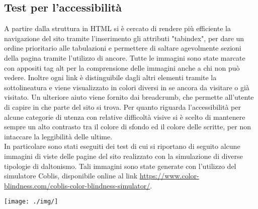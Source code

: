 	\subsection{Test per l'accessibilità}
	A partire dalla struttura in HTML si è cercato di rendere più efficiente la navigazione del sito tramite l'inserimento gli attributi "tabindex", per dare un ordine prioritario alle tabulazioni e permettere di saltare agevolmente sezioni della pagina tramite l'utilizzo di ancore. Tutte le immagini sono state marcate con appositi tag alt per la comprensione delle immagini anche a chi non può vedere. Inoltre ogni link è distinguibile dagli altri elementi tramite la sottolineatura e viene visualizzato in colori diversi in se ancora da visitare o già visitato. Un ulteriore aiuto viene fornito dai breadcrumb, che permette all'utente di capire in che parte del sito si trova. Per quanto riguarda l'accessibilità per alcune categorie di utenza con relative difficoltà visive si è scelto di mantenere sempre un alto contrasto tra il colore di sfondo ed il colore delle scritte, per non intaccare la leggibilità delle ultime.\\
	In particolare sono stati eseguiti dei test di cui si riportano di seguito alcune immagini di viste delle pagine del sito realizzato con la simulazione di diverse tipologie di daltonismo. Tali immagini sono state generate con l'utilizzo del simulatore Coblis, disponibile online al link \url{https://www.color-blindness.com/coblis-color-blindness-simulator/}.
	
	\texttt{[image: ./img/]}

\pagebreak
